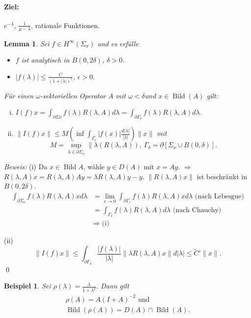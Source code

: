 \documentclass[12pt]{extreport} %
\newtheorem{Lemma}[Satz]{Lemma}
\newtheorem{Beispiel}[Satz]{Beispiel}
\DeclareMathOperator{\Bild}{Bild}
\numberwithin{equation}{section}
\newcommand{\om}{\omega}
\newcommand{\Bew}{\emph{Beweis: }}
\begin{document}
	 \paragraph{Ziel:} $e^{-\lambda}$, $\frac{1}{\mu-\lambda}$, rationale Funktionen. 
	 
	 \begin{Lemma}
	 	Sei $f\in H^\infty(\Sigma_\sigma)$ und es erfülle
	 	\begin{itemize}
	 		\item $f$ ist analytisch in $B(0,2\delta)$, $\delta >0$.
	 		\item $|f(\lambda)| \leq \frac{C}{(1+|\lambda|)^\epsilon}$, $\epsilon> 0$. 
	 	\end{itemize}
	 	Für einen $\om$-sektoriellen Operator $A$ mit $\om<\delta$und $x\in \Bild(A)$ gilt:
	 	\begin{enumerate}[(i)]
	 		\item $I(f)x = \int_{\partial\Sigma\nu} f(\lambda) R(\lambda, A) d\lambda = \int_{\partial \Gamma_\delta} f(\lambda) R(\lambda, A)d\lambda$.
	 		\item $\|I(f)x\|\leq M\left(\inf\int_{\Gamma_\epsilon} |f(x)| \frac{d|\lambda|}{|\lambda|} \right) \|x\|$ mit 
	 		$$M = \sup_{\lambda\in \partial\Sigma_\nu} \|\lambda(R(\lambda, A)), ~ \Gamma_\delta= \partial[\Sigma_\nu\cup B(0,\delta)].$$
	 	\end{enumerate}
	 \end{Lemma}
	 
	 \Bew (i) Da $x\in \Bild A$, wähle $y\in D(A)$ mit $x = Ay$. $\Rightarrow$ $R(\lambda, A)x = R(\lambda, A) Ay = \lambda R(\lambda, A)y - y$. $\|R(\lambda, A)x\|$ ist beschränkt in $B(0,2\delta)$.
	 \begin{align*}
	 	\int_{\partial\Sigma_\nu} f(\lambda) R(\lambda, A)x d\lambda &= \lim\limits_{\epsilon\rightarrow 0} \int_{\partial\Gamma_\epsilon} f(\lambda) R(\lambda, A) xd\lambda \text{ (nach Lebesgue)}\\
	 	&= \int_{\Gamma_\delta} f(\lambda) R(\lambda, A) d\lambda \text{ (nach Chauchy)}\\
	 	&\Rightarrow \text{ (i)}
	 \end{align*}
	 
	 (ii) $$\|I(f)x \| \leq \int_{\partial \Gamma_\delta} \frac{|f(\lambda)|}{|\lambda|} \|\lambda R(\lambda, A)x\| d|\lambda| \leq \tilde{C}' \|x\|.$$
	 \qed
	 
	 \begin{Beispiel}
	 	Sei $\rho(\lambda) = \frac{\lambda}{1+\lambda^2}$. Dann gilt
	 	\begin{align*}
	 		\rho(A) = A(I+A)^{-2}\text{ und}\\
	 		\Bild(\rho(A)) = D(A)\cap \Bild(A).
	 	\end{align*}
	 \end{Beispiel}
	 
\end{document}

